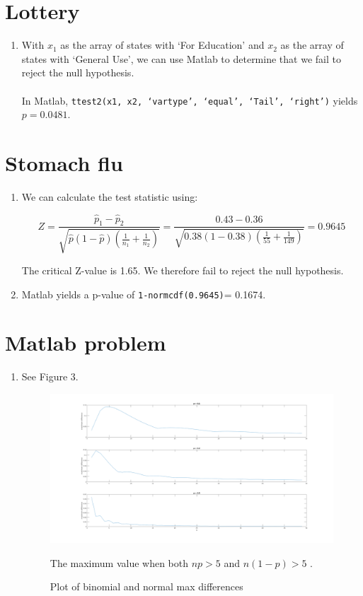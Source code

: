 \documentclass{article}
\begin{document}
\section{Lottery}%
\label{sec:Lottery}
\begin{enumerate}[label=\alph*.]
    \item With $x_1$ as the array of states with `For Education' and $x_2$ as the array of states with `General Use', we can use Matlab to determine that we fail to reject the null hypothesis.\\ \\ 
        In Matlab, \texttt{ttest2(x1, x2, `vartype', `equal', `Tail', `right')} yields $p=0.0481$.
\end{enumerate}

\section{Stomach flu}%
\label{sec:Stomach flu}
\begin{enumerate}[label=\alph*.]
    \item We can calculate the test statistic using:

        $$Z = \frac{\hat{p}_1 - \hat{p}_2}{\sqrt{\hat{p}(1-\hat{p})(\frac{1}{n_1}+\frac{1}{n_2})}} = \frac{0.43 - 0.36}{\sqrt{0.38(1-0.38)(\frac{1}{55}+\frac{1}{149})}}= 0.9645$$

        The critical Z-value is 1.65. We therefore fail to reject the null hypothesis.
    \item Matlab yields a p-value of \texttt{1-normcdf(0.9645)}= 0.1674.
\end{enumerate}

\section{Matlab problem}%
\label{sec:Matlab problem}
\begin{enumerate}[label=\alph*.]
    \item See Figure 3.
\begin{figure}[ht]
\begin{center}
    \includegraphics[scale=0.29]{fig2}
    \caption{Plot of binomial and normal max differences}

\end{center}
The maximum value when both $np>5$ and $n(1-p)>5$ .
\end{figure}
\end{enumerate}


\end{document}
